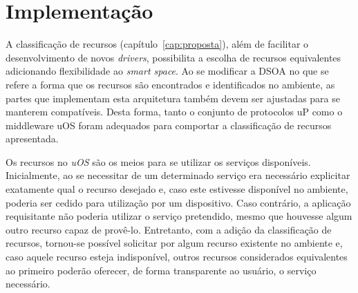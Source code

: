 \chapter{Implementação}

A classificação de recursos (capítulo~\ref{cap:proposta}), além de facilitar o desenvolvimento de novos \emph{drivers}, possibilita a escolha de recursos equivalentes adicionando flexibilidade ao \emph{smart space}. Ao se modificar a DSOA no que se refere a forma que os recursos são encontrados e identificados no ambiente, as partes que implementam esta arquitetura também devem ser ajustadas para se manterem compatíveis. Desta forma, tanto o conjunto de protocolos uP como o middleware uOS foram adequados para comportar a classificação de recursos apresentada.

Os recursos no \emph{uOS} são os meios para se utilizar os serviços disponíveis. Inicialmente, ao se necessitar de um determinado serviço era necessário explicitar exatamente qual o recurso desejado e, caso este estivesse disponível no ambiente, poderia ser cedido para utilização por um dispositivo. Caso contrário, a aplicação requisitante não poderia utilizar o serviço pretendido, mesmo que houvesse algum outro recurso capaz de provê-lo. Entretanto, com a adição da classificação de recursos, tornou-se possível solicitar por algum recurso existente no ambiente e, caso aquele recurso esteja indisponível, outros recursos considerados equivalentes ao primeiro poderão oferecer, de forma transparente ao usuário, o serviço necessário.


